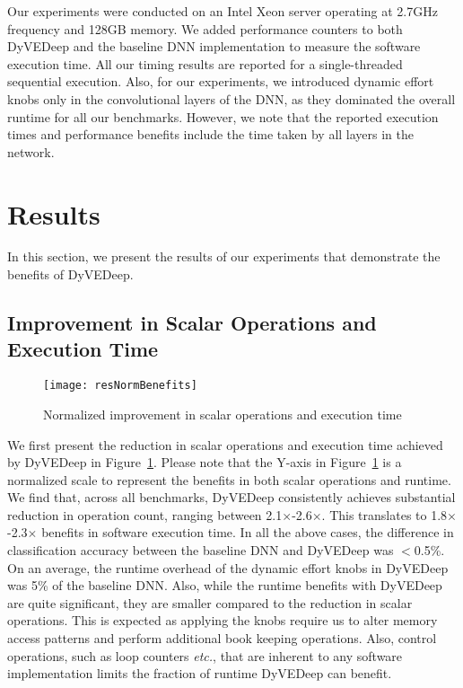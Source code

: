 \documentclass{article} %
\begin{document}
Our experiments were conducted on an Intel Xeon server operating at 2.7GHz frequency and 128GB memory. We added performance counters to both DyVEDeep and the baseline DNN implementation to measure the software execution time. All our timing results are reported for a single-threaded sequential execution. Also, for our experiments, we introduced dynamic effort knobs only in the convolutional layers of the DNN, as they dominated the overall runtime for all our benchmarks. However, we note that the reported execution times and performance benefits include the time taken by all layers in the network.


\section{Results} \label{sec:results}

In this section, we present the results of our experiments that demonstrate the benefits of DyVEDeep.

\subsection{Improvement in Scalar Operations and Execution Time}

\begin{figure}[htb]
\begin{center}
\texttt{[image: resNormBenefits]}
\end{center}
\caption{Normalized improvement in scalar operations and execution time}
\label{fig:resNormBenefits}
\end{figure}

We first present the reduction in scalar operations and execution time achieved by DyVEDeep in Figure~\ref{fig:resNormBenefits}. Please note that the Y-axis in Figure~\ref{fig:resNormBenefits} is a normalized scale to represent the benefits in both scalar operations and runtime. We find that, across all benchmarks, DyVEDeep consistently achieves substantial reduction in operation count, ranging between 2.1$\times$-2.6$\times$. This translates to 1.8$\times$-2.3$\times$ benefits in software execution time. In all the above cases, the difference in classification accuracy between the baseline DNN and DyVEDeep was $<$0.5\%. On an average, the runtime overhead of the dynamic effort knobs in DyVEDeep was 5\% of the baseline DNN. Also, while the runtime benefits with DyVEDeep are quite significant, they are smaller compared to the reduction in scalar operations. This is expected as applying the knobs require us to alter memory access patterns and perform additional book keeping operations. Also, control operations, such as loop counters \emph{etc.}, that are inherent to any software implementation limits the fraction of runtime DyVEDeep can benefit. 
\end{document}
